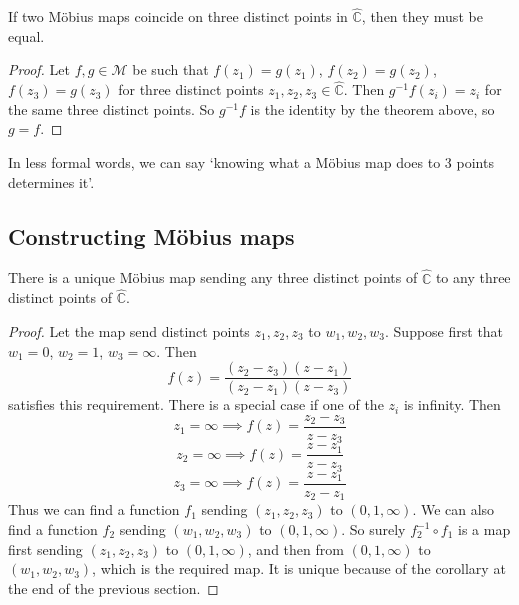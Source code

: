 \begin{corollary}
	If two M\"obius maps coincide on three distinct points in \(\hat{\mathbb C}\), then they must be equal.
\end{corollary}
\begin{proof}
	Let \(f, g \in \mathcal M\) be such that \(f(z_1) = g(z_1)\), \(f(z_2) = g(z_2)\), \(f(z_3) = g(z_3)\) for three distinct points \(z_1, z_2, z_3 \in \hat{\mathbb C}\).
	Then \(g^{-1}f(z_i) = z_i\) for the same three distinct points.
	So \(g^{-1}f\) is the identity by the theorem above, so \(g = f\).
\end{proof}
In less formal words, we can say `knowing what a M\"obius map does to 3 points determines it'.

\subsection{Constructing M\"obius maps}
\begin{theorem}
	There is a unique M\"obius map sending any three distinct points of \(\hat{\mathbb C}\) to any three distinct points of \(\hat{\mathbb C}\).
\end{theorem}
\begin{proof}
	Let the map send distinct points \(z_1, z_2, z_3\) to \(w_1, w_2, w_3\).
	Suppose first that \(w_1 = 0\), \(w_2 = 1\), \(w_3 = \infty\).
	Then
	\[
		f(z) = \frac{(z_2 - z_3)(z - z_1)}{(z_2 - z_1)(z - z_3)}
	\]
	satisfies this requirement.
	There is a special case if one of the \(z_i\) is infinity.
	Then
	\[
		z_1 = \infty \implies f(z) = \frac{z_2 - z_3}{z - z_3}
	\]
	\[
		z_2 = \infty \implies f(z) = \frac{z - z_1}{z - z_3}
	\]
	\[
		z_3 = \infty \implies f(z) = \frac{z - z_1}{z_2 - z_1}
	\]
	Thus we can find a function \(f_1\) sending \((z_1, z_2, z_3)\) to \((0, 1, \infty)\).
	We can also find a function \(f_2\) sending \((w_1, w_2, w_3)\) to \((0, 1, \infty)\).
	So surely \(f_2^{-1}\circ f_1\) is a map first sending \((z_1, z_2, z_3)\) to \((0, 1, \infty)\), and then from \((0, 1, \infty)\) to \((w_1, w_2, w_3)\), which is the required map.
	It is unique because of the corollary at the end of the previous section.
\end{proof}

